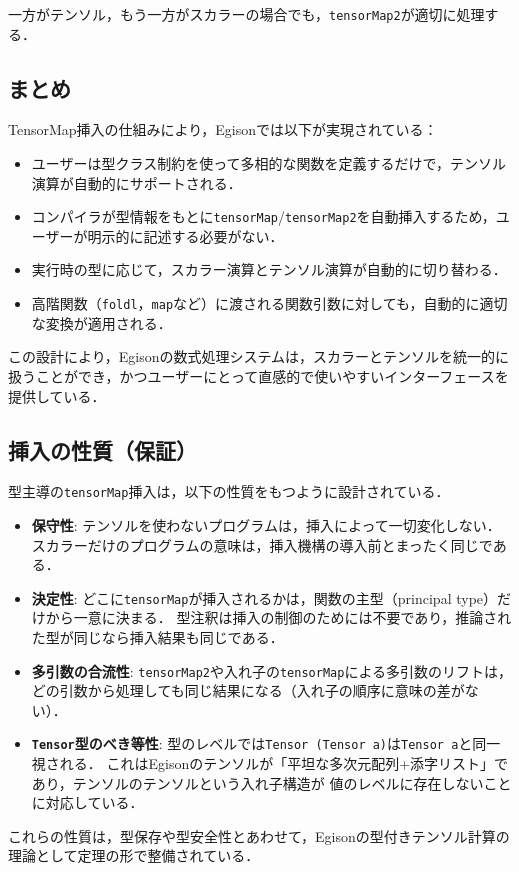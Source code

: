 一方がテンソル，もう一方がスカラーの場合でも，\lstinline{tensorMap2}が適切に処理する．

\subsection{まとめ}

TensorMap挿入の仕組みにより，Egisonでは以下が実現されている：

\begin{itemize}
\item ユーザーは型クラス制約を使って多相的な関数を定義するだけで，テンソル演算が自動的にサポートされる．
\item コンパイラが型情報をもとに\lstinline{tensorMap}/\lstinline{tensorMap2}を自動挿入するため，ユーザーが明示的に記述する必要がない．
\item 実行時の型に応じて，スカラー演算とテンソル演算が自動的に切り替わる．
\item 高階関数（\lstinline{foldl}，\lstinline{map}など）に渡される関数引数に対しても，自動的に適切な変換が適用される．
\end{itemize}

この設計により，Egisonの数式処理システムは，スカラーとテンソルを統一的に扱うことができ，かつユーザーにとって直感的で使いやすいインターフェースを提供している．

\subsection{挿入の性質（保証）}\label{tensor-guarantees}

型主導の\lstinline{tensorMap}挿入は，以下の性質をもつように設計されている．

\begin{itemize}
\item \textbf{保守性}: テンソルを使わないプログラムは，挿入によって一切変化しない．
スカラーだけのプログラムの意味は，挿入機構の導入前とまったく同じである．
\item \textbf{決定性}: どこに\lstinline{tensorMap}が挿入されるかは，関数の主型（principal type）だけから一意に決まる．
型注釈は挿入の制御のためには不要であり，推論された型が同じなら挿入結果も同じである．
\item \textbf{多引数の合流性}: \lstinline{tensorMap2}や入れ子の\lstinline{tensorMap}による多引数のリフトは，
どの引数から処理しても同じ結果になる（入れ子の順序に意味の差がない）．
\item \textbf{\lstinline{Tensor}型のべき等性}: 型のレベルでは\lstinline{Tensor (Tensor a)}は\lstinline{Tensor a}と同一視される．
これはEgisonのテンソルが「平坦な多次元配列+添字リスト」であり，テンソルのテンソルという入れ子構造が
値のレベルに存在しないことに対応している．
\end{itemize}

これらの性質は，型保存や型安全性とあわせて，Egisonの型付きテンソル計算の理論として定理の形で整備されている．
